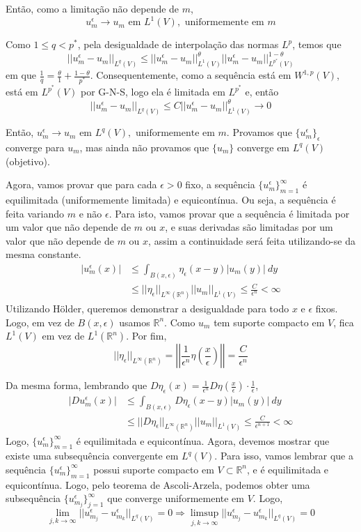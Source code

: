 \documentclass[11pt]{article}
\newcommand{\Rn}{{\mathbb{R}^n}}
\newcommand{\rn}{{\mathbb{R}^n}}
\newcommand{\e}{\epsilon}
\begin{document}
Então, como a limitação não depende de $m$, \[ u_m^\e  \rightarrow u_m \text{ em } L^1(V), \text{ uniformemente em } m  \] 

Como $1 \leq q < p^*$, pela desigualdade de interpolação das normas $L^p$, temos que \[ ||u^\e_m - u_m||_{L^q(V)} \leq ||u^\e_m - u_m||^\theta_{L^1(V)} ||u^\e_m - u_m||^{1-\theta}_{L^{p^*}(V)} \] em que $ \frac{1}{q} = \frac{\theta}{1} + \frac{1-\theta}{p^*} $. Consequentemente, como a sequência está em $W^{1,p}(V)$, está em $L^{p^*}(V)$ por G-N-S, logo ela é limitada em $L^{p^*}$ e, então \[ ||u^\e_m - u_m||_{L^q(V)} \leq C ||u^\e_m - u_m||_{L^1(V)}^\theta \rightarrow 0 \]

Então, \( u_m^\e \rightarrow u_m \text{ em } L^q(V), \text{ uniformemente em } m\). Provamos que $\{u_m^\e\}_\e$ converge para $u_m$, mas ainda não provamos que $\{u_m\}$ converge em $L^q(V)$ (objetivo).

Agora, vamos provar que para cada $\e>0$ fixo, a sequência $\{u_m^\e\}_{m=1}^\infty$ é equilimitada (uniformemente limitada) e equicontínua. Ou seja, a sequência é feita variando $m$ e não $\e$. Para isto, vamos provar que a sequência é limitada por um valor que não depende de $m$ ou $x$, e suas derivadas são limitadas por um valor que não depende de $m$ ou $x$, assim a continuidade será feita utilizando-se da mesma constante.
\begin{align*}
	|u_m^\e(x)| &\leq \int_{B(x,\e)} \eta_\e(x-y)| u_m(y) |\ dy\\
	&\leq ||\eta_\e||_{ L^\infty(\Rn)} ||u_m||_{L^1(V) } \leq \frac{C}{\e^n} < \infty
\end{align*}
Utilizando Hölder, queremos demonstrar a desigualdade para todo $x$ e $\e$ fixos. Logo, em vez de $B(x,\e)$ usamos $\rn$. Como $u_m$ tem suporte compacto em $V$, fica $L^1(V)$ em vez de $L^1(\rn)$. Por fim, \[ ||\eta_\e||_{L^\infty(\rn)} =\left|\left|\frac{1}{\e^n} \eta\left(\frac{x}{\e}\right)\right|\right| = \frac{C}{\e^n} \] 

Da mesma forma, lembrando que $D\eta_\e(x) = \frac{1}{\e^n} D\eta(\frac{x}{\e}) \cdot \frac{1}{\e}$, 
\begin{align*}
	|Du_m^\e(x)| &\leq \int_{B(x,\e)} D\eta_\e(x-y)| u_m(y) |\ dy\\
	&\leq ||D\eta_\e||_{ L^\infty(\Rn)} ||u_m||_{L^1(V) } \leq \frac{C}{\e^{n+1}} < \infty 
\end{align*}
Logo, $\{u_m^\e\}_{m=1}^\infty$ é equilimitada e equicontínua. Agora, devemos mostrar que existe uma subsequência convergente em $L^q(V)$. Para isso, vamos lembrar que a sequência $\{u_m^\e\}_{m=1}^\infty$ possui suporte compacto em $V \subset \rn$, e é equilimitada e equicontínua. Logo, pelo teorema de Ascoli-Arzela, podemos obter uma subsequência $\{u_{m_j}^\e\}_{j=1}^\infty$ que converge uniformemente em $V$. Logo, \[
\lim_{j,k\rightarrow\infty} || u_{m_j}^\e - u_{m_k}^\e ||_{L^q(V)} = 0 \Rightarrow 	\limsup_{j,k\rightarrow\infty} || u_{m_j}^\e - u_{m_k}^\e ||_{L^q(V)} = 0 
\]
\end{document}
